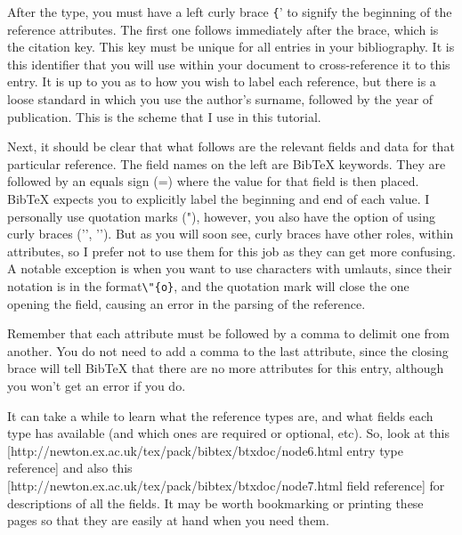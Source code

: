 After the type, you must have a left curly brace \verb|{|' to signify the
beginning of the reference attributes. The first one follows immediately after
the brace, which is the citation key. This key must be unique for all entries
in your bibliography. It is this identifier that you will use within your
document to cross-reference it to this entry. It is up to you as to how you
wish to label each reference, but there is a loose standard in which you use
the author's surname, followed by the year of publication. This is the scheme
that I use in this tutorial.

Next, it should be clear that what follows are the relevant fields and data for
that particular reference. The field names on the left are BibTeX keywords.
They are followed by an equals sign (=) where the value for that field is then
placed.  BibTeX expects you to explicitly label the beginning and end of each
value. I personally use quotation marks ("), however, you also have the option
of using curly braces ('{', '}'). But as you will soon see, curly braces have
other roles, within attributes, so I prefer not to use them for this job as
they can get more confusing. A notable exception is when you want to use
characters with
umlauts, since their notation is in the format\verb|\"{o}|, and the quotation
mark will close the one opening the field, causing an error in the parsing of
the reference.

Remember that each attribute must be followed by a comma to delimit one from
another. You do not need to add a comma to the last attribute, since the
closing brace will tell BibTeX that there are no more attributes for this
entry, although you won't get an error if you do.

It can take a while to learn what the reference types are, and what fields each
type has available (and which ones are required or optional, etc). So, look at
this [http://newton.ex.ac.uk/tex/pack/bibtex/btxdoc/node6.html entry type
reference] and also this
[http://newton.ex.ac.uk/tex/pack/bibtex/btxdoc/node7.html field reference] for
descriptions of all the fields. It may be worth bookmarking or printing these
pages so that they are easily at hand when you need them.

